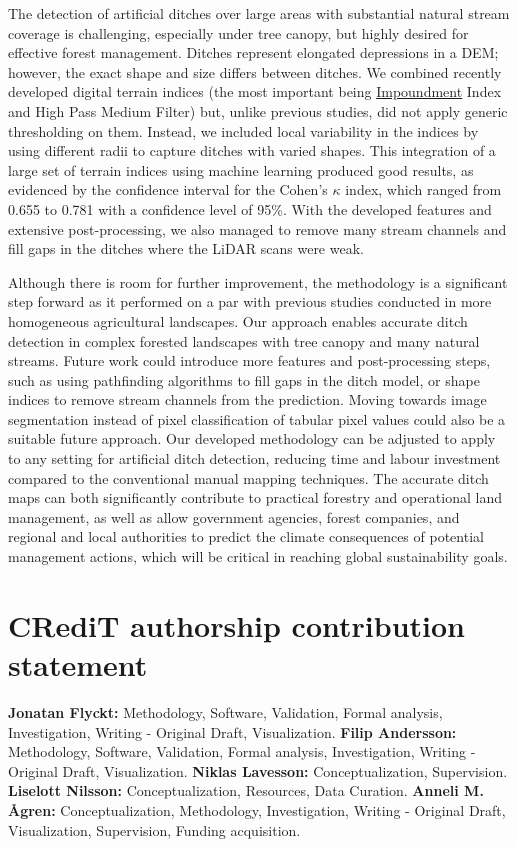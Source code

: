\documentclass[11pt, review]{elsarticle} %
\begin{document}
The detection of artificial ditches over large areas with substantial natural stream coverage is challenging, especially under tree canopy, but highly desired for effective forest management. Ditches represent elongated depressions in a DEM; however, the exact shape and size differs between ditches. We combined recently developed digital terrain indices (the most important being \hyperref[impoundment]{Impoundment} Index and High Pass Medium Filter) but, unlike previous studies, did not apply generic thresholding on them. Instead, we included local variability in the indices by using different radii to capture ditches with varied shapes. This integration of a large set of terrain indices using machine learning produced good results, as evidenced by the confidence interval for the Cohen's $\kappa$ index, which ranged from 0.655 to 0.781 with a confidence level of 95\%. With the developed features and extensive post-processing, we also managed to remove many stream channels and fill gaps in the ditches where the LiDAR scans were weak. 

Although there is room for further improvement, the methodology is a significant step forward as it performed on a par with previous studies conducted in more homogeneous agricultural landscapes. Our approach enables accurate ditch detection in complex forested landscapes with tree canopy and many natural streams. Future work could introduce more features and post-processing steps, such as using pathfinding algorithms to fill gaps in the ditch model, or shape indices to remove stream channels from the prediction. Moving towards image segmentation instead of pixel classification of tabular pixel values could also be a suitable future approach. Our developed methodology can be adjusted to apply to any setting for artificial ditch detection, reducing time and labour investment compared to the conventional manual mapping techniques. The accurate ditch maps can both significantly contribute to practical forestry and operational land management, as well as allow government agencies, forest companies, and regional and local authorities to predict the climate consequences of potential management actions, which will be critical in reaching global sustainability goals.

\section*{CRediT authorship contribution statement}

\textbf{Jonatan Flyckt:} Methodology, Software, Validation, Formal analysis, Investigation, Writing - Original Draft, Visualization. \textbf{Filip Andersson:} Methodology, Software, Validation, Formal analysis, Investigation, Writing - Original Draft, Visualization. \textbf{Niklas Lavesson:} Conceptualization, Supervision. \textbf{Liselott Nilsson:} Conceptualization, Resources, Data Curation. \textbf{Anneli M. \AA gren:} Conceptualization, Methodology, Investigation, Writing - Original Draft, Visualization, Supervision, Funding acquisition.
\end{document}
